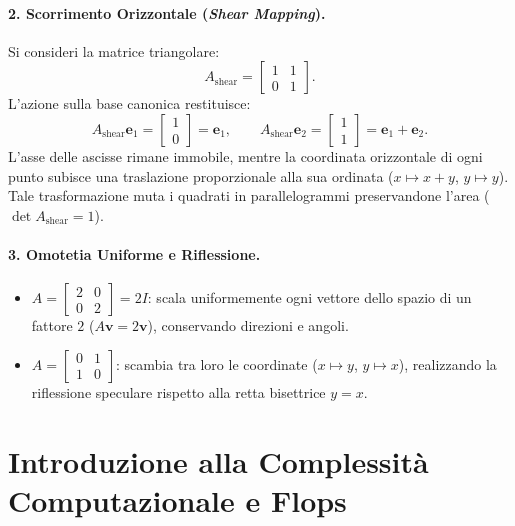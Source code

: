 \paragraph{2. Scorrimento Orizzontale (\textit{Shear Mapping}).}
Si consideri la matrice triangolare:
\begin{equation}
    A_{\text{shear}} = \begin{bmatrix} 1 & 1 \\ 0 & 1 \end{bmatrix}.
\end{equation}
L'azione sulla base canonica restituisce:
\begin{equation}
    A_{\text{shear}} \mathbf{e}_1 = \begin{bmatrix} 1 \\ 0 \end{bmatrix} = \mathbf{e}_1, \qquad A_{\text{shear}} \mathbf{e}_2 = \begin{bmatrix} 1 \\ 1 \end{bmatrix} = \mathbf{e}_1 + \mathbf{e}_2.
\end{equation}
L'asse delle ascisse rimane immobile, mentre la coordinata orizzontale di ogni punto subisce una traslazione proporzionale alla sua ordinata ($x \mapsto x + y$, $y \mapsto y$). Tale trasformazione muta i quadrati in parallelogrammi preservandone l'area ($\det A_{\text{shear}} = 1$).

\paragraph{3. Omotetia Uniforme e Riflessione.}
\begin{itemize}
    \item $A = \begin{bmatrix} 2 & 0 \\ 0 & 2 \end{bmatrix} = 2 I$: scala uniformemente ogni vettore dello spazio di un fattore $2$ ($A \mathbf{v} = 2 \mathbf{v}$), conservando direzioni e angoli.
    \item $A = \begin{bmatrix} 0 & 1 \\ 1 & 0 \end{bmatrix}$: scambia tra loro le coordinate ($x \mapsto y$, $y \mapsto x$), realizzando la riflessione speculare rispetto alla retta bisettrice $y = x$.
\end{itemize}

\FloatBarrier
\section{Introduzione alla Complessità Computazionale e Flops}

